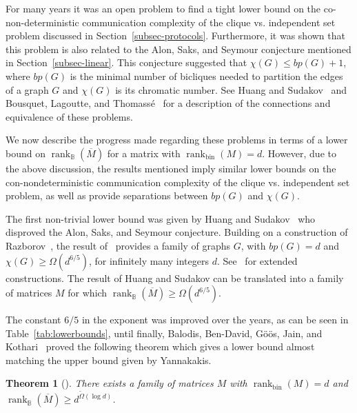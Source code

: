\documentclass[11pt]{article}
\newtheorem{theorem}{Theorem}
\newcommand{\rank}{\mathop{\mathrm{rank}}}
\newcommand{\Rbool}{{\rank}_\mathbb{B}}
\newcommand{\Rbin}{{\rank}_{\mathrm{bin}}}
\begin{document}
{{For many years it was an open problem to find a tight lower bound on the co-non-deterministic communication complexity of the
clique vs. independent set problem discussed in Section~\ref{subsec-protocols}.
Furthermore, it was shown that this problem is also related to the Alon, Saks, and Seymour conjecture mentioned in Section~\ref{subsec-linear}.
This conjecture suggested that $\chi(G) \leq bp(G)+1$, where $bp(G)$  is the minimal number of bicliques  needed to partition the edges of a graph $G$ and $\chi(G)$ is its chromatic number.
See  Huang and Sudakov~\cite{HuangS12} and Bousquet, Lagoutte, and Thomass{\'{e}}~\cite{BousquetLT14} for a description of the connections and equivalence of these problems.

We now describe the progress made regarding these problems in terms of a lower bound on $\Rbool(\overline{M})$ for a matrix with $\Rbin(M) = d$.
However,  due to the above discussion, the results mentioned imply similar lower bounds on
the con-nondeterministic communication complexity of the clique vs. independent set problem,
as well as provide separations between $bp(G)$ and $\chi(G)$.

The first non-trivial lower bound was given by Huang and Sudakov~\cite{HuangS12} who disproved the Alon, Saks, and Seymour conjecture.
Building on a construction of Razborov~\cite{Razborov92}, the result of~\cite{HuangS12} provides a
family of graphs $G$,  with $bp(G)=d$ and $\chi(G) \geq \Omega(d^{6/5})$, for infinitely many integers $d$.
See~\cite{CioabaT11} for extended constructions.
The result of Huang and Sudakov can be translated into a family of  matrices $M$ for which $\Rbool( \overline{M}) \geq \Omega(d^{6/5})$.

The constant $6/5$ in the exponent was improved over the years, as can be seen in Table~\ref{tab:lowerbounds}, until finally,
 Balodis, Ben-David, G{\"{o}}{\"{o}}s, Jain, and Kothari~\cite{BBGJK21} proved the following theorem which gives a lower bound almost matching
 the upper bound given by Yannakakis.

 \begin{theorem}[\cite{BBGJK21}]
 \label{theo-complement}
 There exists  a family of matrices $M$ with $\Rbin(M) = d$ and $\Rbool( \overline{M}) \geq d^{\widetilde{\Omega}(\log d)}$.
 \end{theorem}


}}
\end{document}

